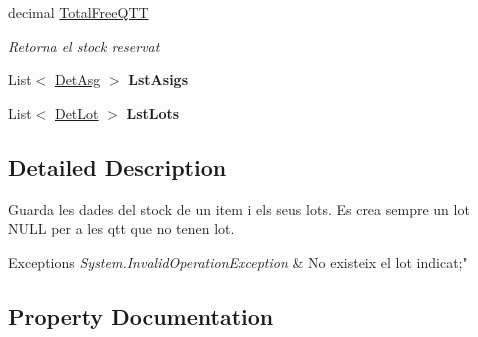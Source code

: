 \begin{DoxyCompactItemize}
decimal \mbox{\hyperlink{class_h_k_supply_1_1_p_r_j___stocks_1_1_classes_1_1_stocks_1_1_item_a2bee7e18e2b400093383e5531b4aa53f}{Total\+Free\+Q\+TT}}
\begin{DoxyCompactList}\small\item\em Retorna el stock reservat \end{DoxyCompactList}\item 
\mbox{\label{class_h_k_supply_1_1_p_r_j___stocks_1_1_classes_1_1_stocks_1_1_item_acd1d1ba5729e8d3223cded0caec408dd}} 
List$<$ \mbox{\hyperlink{class_h_k_supply_1_1_p_r_j___stocks_1_1_classes_1_1_stocks_1_1_det_asg}{Det\+Asg}} $>$ {\bfseries Lst\+Asigs}
\item 
\mbox{\label{class_h_k_supply_1_1_p_r_j___stocks_1_1_classes_1_1_stocks_1_1_item_a0595882b94550a901bff84b9789be59a}} 
List$<$ \mbox{\hyperlink{class_h_k_supply_1_1_p_r_j___stocks_1_1_classes_1_1_stocks_1_1_det_lot}{Det\+Lot}} $>$ {\bfseries Lst\+Lots}
\end{DoxyCompactItemize}


\subsection{Detailed Description}
Guarda les dades del stock de un item i els seus lots. Es crea sempre un lot N\+U\+LL per a les qtt que no tenen lot. 


\begin{DoxyExceptions}{Exceptions}
{\em System.\+Invalid\+Operation\+Exception} & No existeix el lot indicat;"\\
\hline
\end{DoxyExceptions}


\subsection{Property Documentation}
\mbox{\label{class_h_k_supply_1_1_p_r_j___stocks_1_1_classes_1_1_stocks_1_1_item_a552fb47c225ce03aa591ae1a45eca555}} 
